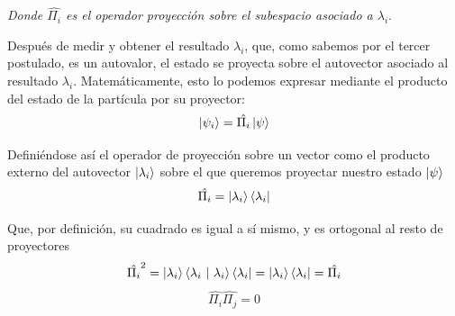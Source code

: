 \documentclass[12pt]{article}
\numberwithin{equation}{section} %
\begin{document}
    \vspace{2mm}
    \textit{Donde \( \hat{\Pi_{i}} \) es el operador proyección sobre el subespacio asociado a \( \lambda_{i} \)}.
    
    \vspace{5mm}

    Después de medir y obtener el resultado \( \lambda_{i} \), que, como sabemos por el tercer postulado, es un autovalor, el estado se proyecta sobre el autovector asociado al resultado \( \lambda_{i} \). Matemáticamente, esto lo podemos expresar mediante el producto del estado de la partícula por su proyector:
    \begin{equation}
        \ket{\psi_{i}} = \hat{\Pi_{i}} \ket{\psi}
        \label{eq: proyeccion_estado}
    \end{equation}

    \vspace{1.5mm}

    Definiéndose así el operador de proyección sobre un vector como el producto externo del autovector \( \ket{\lambda_{i}} \) sobre el que queremos proyectar nuestro estado \( \ket{\psi} \)
    \begin{equation*}
        \hat{\Pi_{i}} = \ket{\lambda_{i}} \bra{\lambda_{i}}
    \end{equation*} 

    \vspace{1.5mm}

    Que, por definición, su cuadrado es igual a sí mismo, y es ortogonal al resto de proyectores
    \begin{equation*}
        \hat{\Pi_{i}} ^ {2} = \ket{\lambda_{i}} \braket{\lambda_{i} \ | \ \lambda_{i}} \bra{\lambda_{i}} = \ket{\lambda_{i}} \bra{\lambda_{i}} = \hat{\Pi_{i}}
    \end{equation*}
    \begin{equation*}
        \hat{\Pi_{i}} \hat{\Pi_{j}} = 0
    \end{equation*}

    \vspace{1.5mm}
\end{document}
